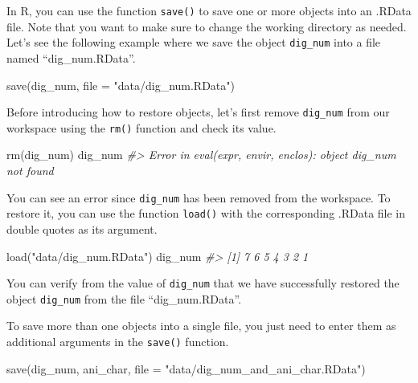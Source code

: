 \documentclass[
]{book}
\newenvironment{Shaded}{\begin{snugshade}}{\end{snugshade}}
\newcommand{\AttributeTok}[1]{\textcolor[rgb]{0.77,0.63,0.00}{#1}}
\newcommand{\CommentTok}[1]{\textcolor[rgb]{0.56,0.35,0.01}{\textit{#1}}}
\newcommand{\FunctionTok}[1]{\textcolor[rgb]{0.00,0.00,0.00}{#1}}
\newcommand{\NormalTok}[1]{#1}
\newcommand{\StringTok}[1]{\textcolor[rgb]{0.31,0.60,0.02}{#1}}
\begin{document}
In R, you can use the function \texttt{save()} to save one or more objects into an .RData file. Note that you want to make sure to change the working directory as needed. Let's see the following example where we save the object \texttt{dig\_num} into a file named ``dig\_num.RData''.

\begin{Shaded}
\begin{Highlighting}[]
\FunctionTok{save}\NormalTok{(dig\_num, }\AttributeTok{file =} \StringTok{"data/dig\_num.RData"}\NormalTok{)}
\end{Highlighting}
\end{Shaded}

Before introducing how to restore objects, let's first remove \texttt{dig\_num} from our workspace using the \texttt{rm()} function and check its value.

\begin{Shaded}
\begin{Highlighting}[]
\FunctionTok{rm}\NormalTok{(dig\_num)}
\NormalTok{dig\_num}
\CommentTok{\#\textgreater{} Error in eval(expr, envir, enclos): object \textquotesingle{}dig\_num\textquotesingle{} not found}
\end{Highlighting}
\end{Shaded}

You can see an error since \texttt{dig\_num} has been removed from the workspace. To restore it, you can use the function \texttt{load()} with the corresponding .RData file in double quotes as its argument.

\begin{Shaded}
\begin{Highlighting}[]
\FunctionTok{load}\NormalTok{(}\StringTok{"data/dig\_num.RData"}\NormalTok{)}
\NormalTok{dig\_num}
\CommentTok{\#\textgreater{} [1] 7 6 5 4 3 2 1}
\end{Highlighting}
\end{Shaded}

You can verify from the value of \texttt{dig\_num} that we have successfully restored the object \texttt{dig\_num} from the file ``dig\_num.RData''.

To save more than one objects into a single file, you just need to enter them as additional arguments in the \texttt{save()} function.

\begin{Shaded}
\begin{Highlighting}[]
\FunctionTok{save}\NormalTok{(dig\_num, ani\_char, }\AttributeTok{file =} \StringTok{"data/dig\_num\_and\_ani\_char.RData"}\NormalTok{)}
\end{Highlighting}
\end{Shaded}
\end{document}
